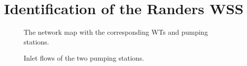 \newpage

\section{Identification of the Randers WSS}
\label{identification_of_the_randers_WSS} 

\begin{figure}[H]
\centering

\caption{The network map with the corresponding WTs and pumping stations.}
\label{fig:simplified_network_identification}
\end{figure}
\vspace{-3mm}


 \begin{figure}[H]
 \centering
  
 \vspace{-2.5mm}
 \label{fig:sigma_id}
 \end{figure}
\vspace{-8mm}

 \begin{figure}[H]
 \centering
  
 \vspace{-2.5mm}
 \caption{Inlet flows of the two pumping stations.}
 \label{fig:dk_12}
 \end{figure}
 \vspace{-3mm}